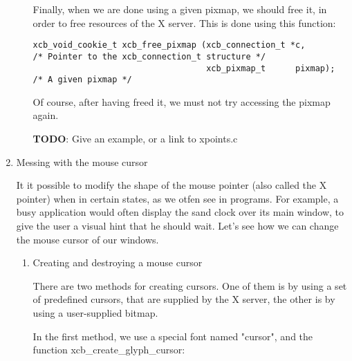 \documentclass[12pt,oneside,titlepage]{book}
\begin{document}
\begin{enumerate}
\begin{enumerate}
    Finally, when we are done using a given pixmap, we should free it,
    in order to free resources of the X server. This is done using this
    function:

\begin{verbatim}
xcb_void_cookie_t xcb_free_pixmap (xcb_connection_t *c,        /* Pointer to the xcb_connection_t structure */
                                   xcb_pixmap_t      pixmap);  /* A given pixmap */
\end{verbatim}

    Of course, after having freed it, we must not try accessing the
    pixmap again.

    \textbf{TODO}: Give an example, or a link to xpoints.c
  \end{enumerate}
\item
  \protect\hypertarget{mousecursor}{}{Messing with the mouse cursor}

  It it possible to modify the shape of the mouse pointer (also called
  the X pointer) when in certain states, as we otfen see in programs.
  For example, a busy application would often display the sand clock
  over its main window, to give the user a visual hint that he should
  wait. Let's see how we can change the mouse cursor of our windows.

  \begin{enumerate}
  \item
    \protect\hypertarget{mousecursorcreate}{}{Creating and destroying a
    mouse cursor}

    There are two methods for creating cursors. One of them is by using
    a set of predefined cursors, that are supplied by the X server, the
    other is by using a user-supplied bitmap.

    In the first method, we use a special font named "cursor", and the
    function {xcb\_create\_glyph\_cursor}:


\end{enumerate}
\end{enumerate}
\end{document}
